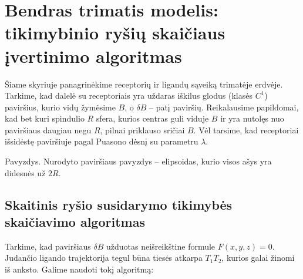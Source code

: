 \documentclass[10pt]{article}
\begin{document}
  


\section{Bendras trimatis modelis: tikimybinio ryšių skaičiaus įvertinimo algoritmas}

Šiame skyriuje panagrinėkime receptorių ir ligandų sąveiką trimatėje erdvėje. Tarkime, kad dalelė su receptoriais yra uždaras iškilus  glodus (klasės $ C^1 $) paviršius, kurio vidų žymėsime $ B $, o $ \delta B  $ -- patį paviršių. Reikalausime papildomai, kad bet kuri  spindulio $R$ sfera, kurios centras guli viduje $ B $ ir yra nutolęs nuo  paviršiaus daugiau negu $ R $, pilnai priklauso sričiai $ B $.  Vėl tarsime, kad receptoriai išsidėstę paviršiuje  pagal Puasono dėsnį su parametru $ \lambda $.

Pavyzdys. Nurodyto paviršiaus pavyzdys -- elipsoidas, kurio visos ašys yra didesnės už $ 2R $.


 
\subsection{Skaitinis ryšio susidarymo tikimybės skaičiavimo algoritmas}
Tarkime, kad paviršiaus $ \delta B $ užduotas neišreikštine formule $ F(x,y,z) = 0 $. Judančio ligando trajektorija tegul būna tiesės atkarpa $ T_{1}T_{2} $, kurios galai žinomi iš anksto. Galime naudoti tokį  algoritmą:
\end{document}
